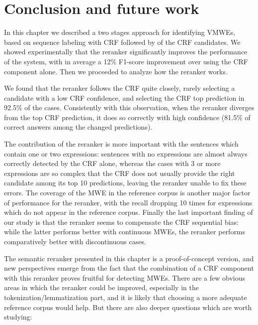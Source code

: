 \documentclass[output=paper
,modfonts
,nonflat]{langsci/langscibook}
\begin{document}
\section{\label{moreau:sec:conc2}Conclusion and future work}


In this chapter we described a two stages approach for identifying
VMWEs, based on sequence labeling with CRF followed by  of
the CRF candidates. We showed experimentally that the reranker
significantly improves the performance of the system, with in average
a 12\% F1-score improvement over using the CRF component alone. Then
we proceeded to analyze how the reranker works.

We found that the reranker follows the CRF quite closely, rarely
selecting a candidate with a low CRF confidence, and selecting the CRF
top prediction in 92.5\% of the cases. Consistently with this
observation, when the reranker diverges from the top CRF prediction,
it does so correctly with high confidence (81.5\% of correct answers
among the changed predictions).

The contribution of the reranker is more important with the sentences
which contain one or two expressions: sentences with no expressions
are almost always correctly detected by the CRF alone, whereas the
cases with 3 or more expressions are so complex that the CRF does not
usually provide the right candidate among its top 10 predictions,
leaving the reranker unable to fix these errors. The coverage of the
MWE in the reference corpus is another major factor of performance for
the reranker, with the recall dropping 10 times for expressions which
do not appear in the reference corpus. Finally the last important
finding of our study is that the reranker seems to compensate the CRF
sequential bias: while the latter performs better with continuous
MWEs, the reranker performs comparatively better with discontinuous
cases.

The semantic reranker presented in this chapter is a proof-of-concept
version, and new perspectives emerge from the fact that the
combination of a CRF component with this reranker proves fruitful for
detecting MWEs. There are a few obvious areas in which the reranker
could be improved, especially in the tokenization/lemmatization part,
and it is likely that choosing a more adequate reference corpus would
help. But there are also deeper questions which are worth studying:
\end{document}
